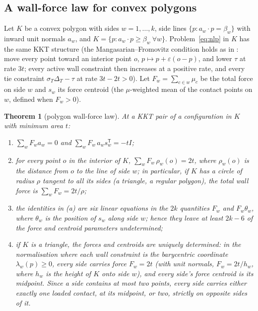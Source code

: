 \documentclass[11pt]{amsart}
\newtheorem{theorem}{Theorem}[section]
\theoremstyle{definition}
\begin{document}
\subsection{A wall-force law for convex polygons}
Let $K$ be a convex polygon with sides $w = 1,\dots,k$, side lines $\{p : a_w\cdot p = \beta_w\}$ with inward unit normals $a_w$, and $K = \{p : a_w \cdot p \ge \beta_w \ \forall w\}$. Problem~\eqref{eq:nlp} in $K$ has the same KKT structure (the Mangasarian--Fromovitz condition holds as in \cite{Trela}: move every point toward an interior point $o$, $p \mapsto p + \varepsilon(o-p)$, and lower $\tau$ at rate $3t$; every active wall constraint then increases at a positive rate, and every tie constraint $\sigma_T\Delta_T - \tau$ at rate $3t - 2t > 0$). Let $F_w = \sum_{c \in w} \mu_c$ be the total force on side $w$ and $s_w$ its force centroid (the $\mu$-weighted mean of the contact points on $w$, defined when $F_w > 0$). %

\begin{theorem}[polygon wall-force law]\label{thm:polygon}
At a KKT pair of a configuration in $K$ with minimum area $t$:
\begin{enumerate}[label=(\alph*)]
\item $\sum_w F_w a_w = 0$ and $\sum_w F_w\, a_w s_w^{\mathsf T} = -tI$;
\item for every point $o$ in the interior of $K$, $\sum_w F_w\, \rho_w(o) = 2t$, where $\rho_w(o)$ is the distance from $o$ to the line of side $w$; in particular, if $K$ has a circle of radius $\rho$ tangent to all its sides (a triangle, a regular polygon), the total wall force is $\sum_w F_w = 2t/\rho$;
\item the identities in (a) are six linear equations in the $2k$ quantities $F_w$ and $F_w\theta_w$, where $\theta_w$ is the position of $s_w$ along side $w$; hence they leave at least $2k-6$ of the force and centroid parameters undetermined;
\item if $K$ is a triangle, the forces and centroids are uniquely determined: in the normalisation where each wall constraint is the barycentric coordinate $\lambda_w(p) \ge 0$, every side carries force $F_w = 2t$ (with unit normals, $F_w = 2t/h_w$, where $h_w$ is the height of $K$ onto side $w$), and every side's force centroid is its midpoint. Since a side contains at most two points, every side carries either exactly one loaded contact, at its midpoint, or two, strictly on opposite sides of it.
\end{enumerate}
\end{theorem}
\end{document}
